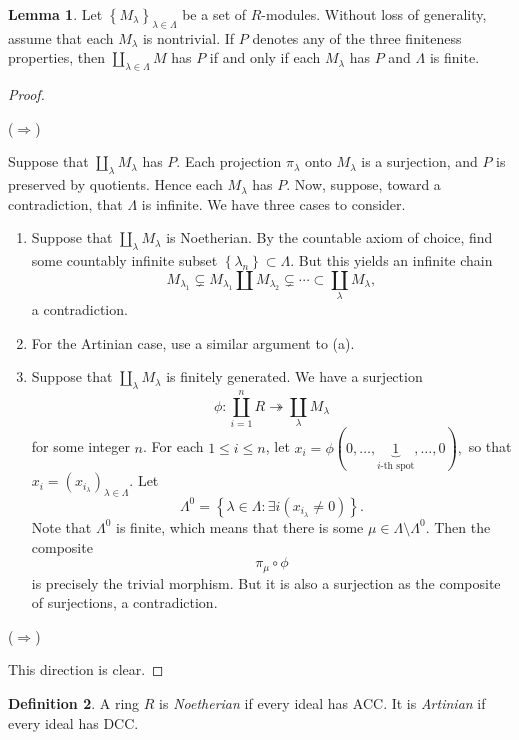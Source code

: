\documentclass[10pt,letterpaper,cm]{nupset}
\theoremstyle{definition}
\newtheorem{definition}{Definition}[subsection]
\theoremstyle{theorem}
\newtheorem{lemma}[definition]{Lemma}
\theoremstyle{remark}
\newcommand{\1}{\mathbf{1}}
\newcommand{\0}{\vec 0}
\newcommand{\dcc}{\textsf{DCC}\xspace}
\newcommand{\acc}{\textsf{ACC}\xspace}
\begin{document}
\begin{lemma}
Let $\left\{M_{\lambda}\right\}_{\lambda\in \Lambda}$ be a set of $R$-modules. Without loss of generality, assume that each $M_{\lambda}$ is nontrivial. If $P$ denotes any of the three finiteness properties, then $\coprod_{\lambda \in \Lambda} M$ has $P$  if and only if each $M_{\lambda}$ has $P$ and $\Lambda$ is finite.
\end{lemma}
\begin{proof} $ $
\smallskip

($\Longrightarrow$)

 Suppose that $\coprod_{\lambda} M_{\lambda}$ has $P$. Each projection $\pi_{\lambda}$ onto $M_{\lambda}$ is a surjection, and $P$ is preserved by quotients. Hence each $M_{\lambda}$ has $P$. Now, suppose, toward a contradiction, that $\Lambda$ is infinite. We have three cases to consider.
\begin{enumerate}[label=(\alph*)]
\item Suppose that $\coprod_{\lambda} M_{\lambda}$ is Noetherian. By the countable axiom of choice, find some countably infinite subset $\left\{\lambda_n\right\}\subset \Lambda.$ But this yields an infinite chain $$M_{\lambda_1} \subsetneq M_{\lambda_1} \coprod M_{\lambda_2} \subsetneq \cdots \subset \coprod_{\lambda} M_{\lambda},$$ a contradiction.
\item For the Artinian case, use a similar argument to (a).
\item Suppose that $\coprod_{\lambda} M_{\lambda}$ is finitely generated. We have a surjection $$\phi: \coprod_{i=1}^n R \twoheadrightarrow \coprod_{\lambda} M_{\lambda}$$ for some integer $n$. For each $1\leq i\leq n$, let $x_i = \phi(0, \ldots, \underbrace{1}_{i\text{-th spot}}, \ldots, 0),$ so that $x_i = \left(x_{i_{\lambda}}\right)_{\lambda \in \Lambda}$. Let $$\Lambda^0 = \left\{\lambda \in \Lambda : \exists i\left(x_{i_\lambda}\ne 0\right)\right\} .$$ Note that $\Lambda^0$ is finite, which means that there is some $\mu \in \Lambda \setminus \Lambda^0$.  Then the composite $$\pi_{\mu} \circ \phi$$ is precisely the trivial morphism. But it is also a surjection as the composite of surjections, a contradiction. 
\end{enumerate}

($\Longrightarrow$)

This direction is clear.
\end{proof}

\begin{definition}
A ring $R$ is \textit{Noetherian} if every ideal has  \acc. It is \textit{Artinian} if every ideal has \dcc.
\end{definition}
\end{document}

